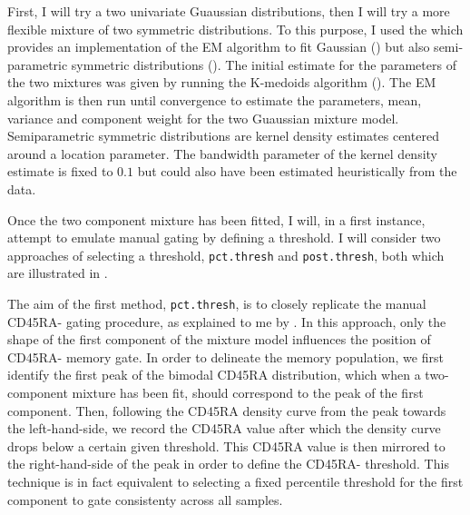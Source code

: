 First, I will try a two univariate Guaussian distributions, then I will try a more flexible mixture of two symmetric distributions.
To this purpose, I used the   which provides an implementation of the \Gls{EM} algorithm \citep{Dempster:1977ul}
to fit Gaussian () but also semi-parametric symmetric distributions ().
The initial estimate for the parameters of the two mixtures was given by running the K-medoids algorithm ().
The EM algorithm is then run until convergence to estimate the parameters, mean, variance and component weight for the two Guaussian mixture model.
Semiparametric symmetric distributions are kernel density estimates centered around a location parameter.
The bandwidth parameter of the kernel density estimate is fixed to $0.1$ but could also have been estimated heuristically from the data.

Once the two component mixture has been fitted, I will, in a first instance, attempt to emulate manual gating by defining a threshold.
I will consider two approaches of selecting a threshold, \texttt{pct.thresh} and \texttt{post.thresh}, both which are illustrated in .

The aim of the first method, \texttt{pct.thresh}, is to closely replicate the manual CD45RA- gating procedure, as explained to me by .
In this approach, only the shape of the first component of the mixture model influences the position of CD45RA- memory gate.
In order to delineate the memory population, we first identify the first peak of the bimodal CD45RA distribution,
which when a two-component mixture has been fit, should correspond to the peak of the first component.
Then, following the CD45RA density curve from the peak towards the left-hand-side,
we record the CD45RA value after which the density curve drops below a certain given threshold.
This CD45RA value is then mirrored to the right-hand-side of the peak in order to define the CD45RA- threshold.
This technique is in fact equivalent to selecting a fixed percentile threshold
for the first component to gate consistenty across all samples.

